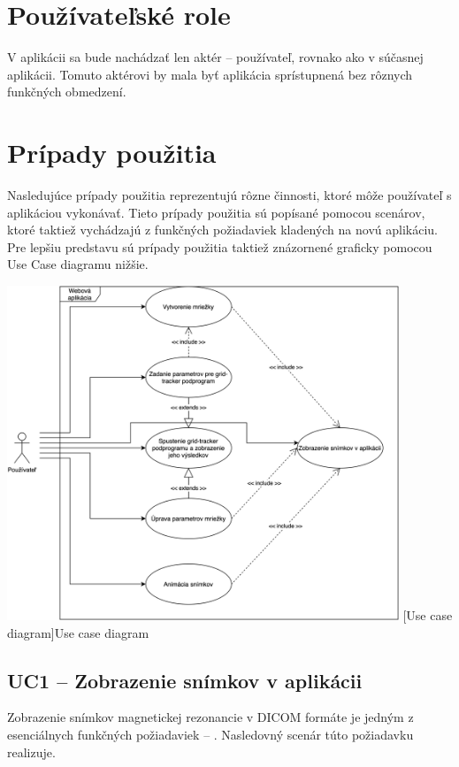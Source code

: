 \section {Používateľské role}
V aplikácii sa bude nachádzať len aktér -- používateľ, rovnako ako v súčasnej aplikácii. Tomuto aktérovi by mala byť aplikácia sprístupnená bez rôznych funkčných obmedzení.

\section {Prípady použitia}
Nasledujúce prípady použitia reprezentujú rôzne činnosti, ktoré môže používateľ s aplikáciou vykonávať. Tieto prípady použitia sú popísané pomocou scenárov, ktoré taktiež vychádzajú z funkčných požiadaviek kladených na novú aplikáciu. Pre lepšiu predstavu sú prípady použitia taktiež znázornené graficky pomocou Use Case diagramu nižšie.

\begin {center}
        \centering
        \includegraphics[height=10cm]{media/graphs/usecase.png}
        \captionsetup{justification=centering}
        [Use case diagram]{Use case diagram}
\end {center}

\clearpage

\subsection {UC1 -- Zobrazenie snímkov v aplikácii}\label{uc1}
Zobrazenie snímkov magnetickej rezonancie v DICOM formáte je jedným z esenciálnych funkčných požiadaviek -- . Nasledovný scenár túto požiadavku realizuje.

